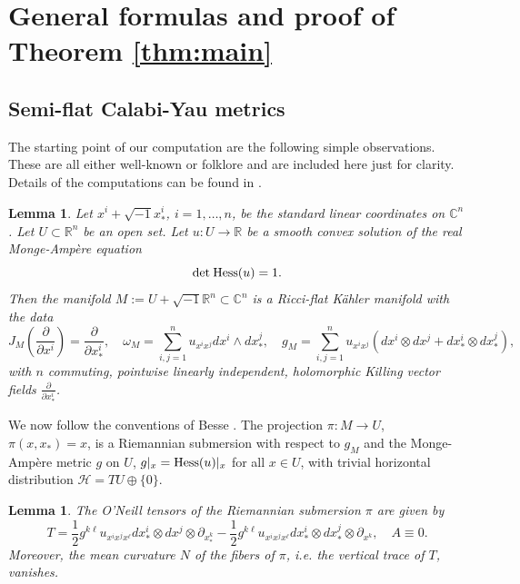 \documentclass[11pt,reqno]{amsart}
\newcommand{\C}{\mathbb{C}}
\newcommand{\R}{\mathbb{R}}
\theoremstyle{plain}
\newtheorem{lemma}[theorem]{Lemma}
\theoremstyle{definition}
\numberwithin{equation}{section}
\begin{document}
\section{General formulas and proof of Theorem \ref{thm:main}}\label{sec:general}

\subsection{Semi-flat Calabi-Yau metrics}

The starting point of our computation are the following simple observations. These are all either well-known or folklore and are included here just for clarity. Details of the computations can be found in \cite[Chapter 4.1]{JSAR}.

\begin{lemma}\label{MAMG}
    Let $x^i + \sqrt{-1}x^i_*$, $i = 1, \ldots, n$, be the standard linear coordinates on $\mathbb{C}^n$. Let $U\subset \R^n$ be an open set. Let $u:U\to \R$ be a smooth convex solution of the real Monge-Ampère equation 
    \begin{equation}\label{MA}
    \det \hspace{0.25mm} {\rm Hess}(u)=1.
    \end{equation}
    Then the manifold $M:=U + \sqrt{-1}\R^n\subset\C^{n}$ is a Ricci-flat Kähler manifold with the data
  $$J_M\left( \frac{\partial}{\partial x^i}\right)=\frac{\partial}{\partial x_{*}^{i}}, \quad \omega_M=\displaystyle \sum_{i,j=1}^n u_{x^{i}x^{j}}dx^{i}\wedge dx^{j}_{*},\quad g_M=\displaystyle \sum_{i,j=1}^n u_{x^{i}x^{j}}(dx^{i}\otimes dx^{j}+dx_{*}^{i}\otimes dx_{*}^{j}),$$
with $n$ commuting, pointwise linearly independent, holomorphic Killing vector fields $\frac{\partial}{\partial x^i_*}$. 
\end{lemma}

We now follow the conventions of Besse \cite[Chapter 9]{Besse}.  The projection $\pi: M\to U$, $\pi(x,x_{*})=x$, is a Riemannian submersion with respect to $g_M$ and the Monge-Ampère metric $g$ on $U$, $g|_x = {\rm Hess}(u)|_x$ for all $x \in U$, with trivial horizontal distribution $\mathscr{H} = TU \oplus \{0\}$.

  \begin{lemma}\label{TA}
The O'Neill tensors of the Riemannian submersion $\pi$ are given by
$$T=\frac{1}{2}g^{k\ell}u_{x^{i}x^{j}x^{\ell}}dx_{*}^{i}\otimes dx^j\otimes \partial_{x^{k}_{*}}-\frac{1}{2} g^{k\ell}u_{x^{i}x{^j}x^{\ell}}dx_{*}^{i}\otimes dx_{*}^{j}\otimes \partial_{x^{k}},\quad A\equiv 0.$$
Moreover, the mean curvature $N$ of the fibers of $\pi$, i.e. the vertical trace of $T$, vanishes.
  \end{lemma}
\end{document}
